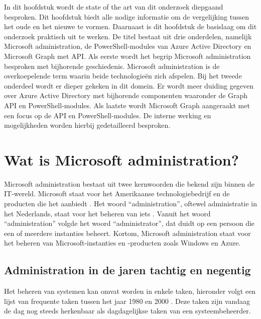 In dit hoofdstuk wordt de state of the art van dit onderzoek diepgaand besproken. Dit hoofdstuk biedt alle nodige informatie om de vergelijking tussen het oude en het nieuwe te vormen. Daarnaast is dit hoofdstuk de basislaag om dit onderzoek praktisch uit te werken. De titel bestaat uit drie onderdelen, namelijk Microsoft administration, de PowerShell-modules van Azure Active Directory en Microsoft Graph met \ac{API}. Als eerste wordt het begrip Microsoft administration besproken met bijhorende geschiedenis. Microsoft administration is de overkoepelende term waarin beide technologieën zich afspelen. Bij het tweede onderdeel wordt er dieper gekeken in dit domein. Er wordt meer duiding gegeven over Azure Active Directory met bijhorende componenten waaronder de Graph \Ac{API} en PowerShell-modules. Als laatste wordt Microsoft Graph aangeraakt met een focus op de \ac{API} en PowerShell-modules. De interne werking en mogelijkheden worden hierbij gedetailleerd besproken.


\section{Wat is Microsoft administration?}


Microsoft administration bestaat uit twee kernwoorden die bekend zijn binnen de \ac{IT}-wereld. Microsoft staat voor het Amerikaanse technologiebedrijf en de producten die het aanbiedt \autocite{Warner2019}. Het woord “administration”, oftewel administratie in het Nederlands, staat voor het beheren van iets \autocite{Burgess2003}. Vanuit het woord “administration” volgde het woord “administrator”, dat duidt op een persoon die een of meerdere instanties beheert. Kortom, Microsoft administration staat voor het beheren van Microsoft-instanties en -producten zoals Windows en Azure. 

\subsection{Administration in de jaren tachtig en negentig}


Het beheren van systemen kan omvat worden in enkele taken, hieronder volgt een lijst van frequente taken tussen het jaar 1980 en 2000 \autocite{Frisch2002}. Deze taken zijn vandaag de dag nog steeds herkenbaar als dagdagelijkse taken van een systeembeheerder.

